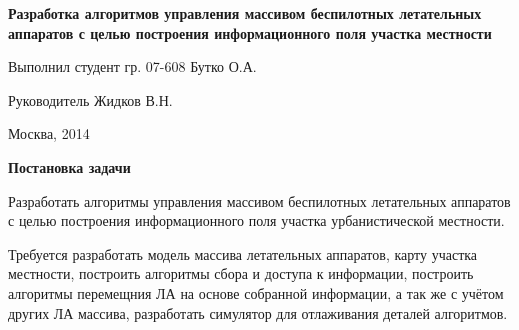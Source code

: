



\begin{slide}
\begin{center}

    \textbf{ Разработка алгоритмов управления
    массивом беспилотных летательных аппаратов
    с целью построения информационного поля
    участка местности}

    \vspace{4em}

    \begin{flushright}
    \small Выполнил студент гр. 07-608 Бутко О.А.

    \small Руководитель Жидков В.Н.
    \end{flushright}

    \vspace{2em}

    \small Москва, 2014

\end{center}
\end{slide}

\begin{slide}

\makeatletter
\let\@topfil\relax
\makeatother

    \textbf{Постановка задачи}

    Разработать алгоритмы управления
    массивом беспилотных летательных аппаратов
    с целью построения информационного поля
    участка урбанистической местности.

    Требуется разработать модель массива летательных аппаратов,
    карту участка местности, построить алгоритмы сбора и доступа
    к информации, построить алгоритмы перемещния ЛА на основе собранной
    информации, а так же с учётом других ЛА массива,
    разработать симулятор для отлаживания деталей алгоритмов.
\end{slide}

